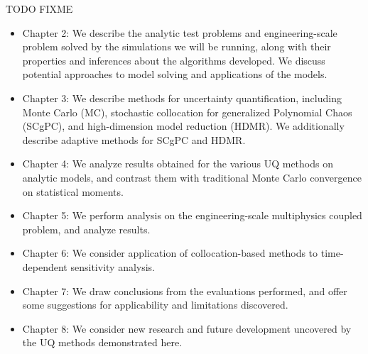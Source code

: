 TODO FIXME
\begin{itemize}
  \item Chapter 2: We describe the analytic test problems and engineering-scale problem solved by the simulations 
    we will be running, along with their properties and inferences about the algorithms developed.
    We discuss potential approaches to model solving and applications of the models.
  \item Chapter 3: We describe methods for uncertainty quantification, including Monte Carlo (MC),
    stochastic collocation for generalized Polynomial Chaos (SCgPC), and high-dimension model reduction
    (HDMR).  We additionally describe adaptive methods for SCgPC and HDMR.
  \item Chapter 4: We analyze results obtained for the various UQ methods on analytic models, and contrast 
    them with traditional Monte Carlo convergence on statistical moments.
  \item Chapter 5: We perform analysis on the engineering-scale multiphysics coupled problem, and analyze
    results.
  \item Chapter 6: We consider application of collocation-based methods to time-dependent sensitivity analysis.
  \item Chapter 7: We draw conclusions from the evaluations performed, and offer some suggestions for
    applicability and limitations discovered.
  \item Chapter 8: We consider new research and future development uncovered by the UQ methods demonstrated here.
\end{itemize}
